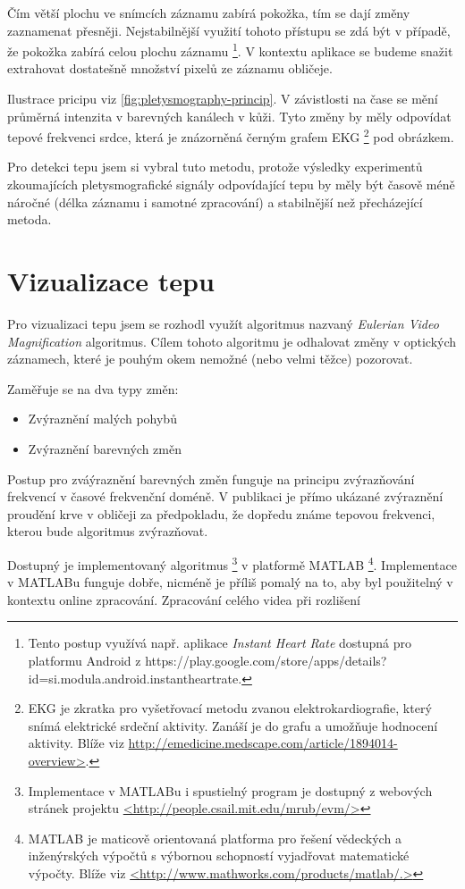 \documentclass[
  digital, %
  table,   %
%
  lof,     %
  lot,     %
]{fithesis3}
\begin{document}
Čím větší plochu ve snímcích záznamu zabírá pokožka, tím se dají změny zaznamenat přesněji. Nejstabilnější využití tohoto přístupu se zdá být v případě, že pokožka zabírá celou plochu záznamu
\footnote{Tento postup využívá např. aplikace \emph{Instant Heart Rate} dostupná pro platformu Android z https://play.google.com/store/apps/details?id=si.modula.android.instantheartrate.}. V kontextu aplikace se budeme snažit extrahovat dostatešně množství pixelů ze záznamu obličeje.

Ilustrace pricipu viz \ref{fig:pletysmography-princip}. V závistlosti na čase se mění průměrná intenzita v barevných kanálech v kůži. Tyto změny by měly odpovídat tepové frekvenci srdce, která je znázorněná černým grafem EKG
\footnote{EKG je zkratka pro vyšetřovací metodu zvanou elektrokardiografie, který snímá elektrické srdeční aktivity. Zanáší je do grafu a umožňuje hodnocení aktivity. Blíže viz \url{http://emedicine.medscape.com/article/1894014-overview>}.} pod obrázkem.

Pro detekci tepu jsem si vybral tuto metodu, protože výsledky experimentů\cite{remote-plethysmographic} zkoumajících pletysmografické signály odpovídající tepu by měly být časově méně náročné (délka záznamu i samotné zpracování) a stabilnější než přecházející metoda.

\section {Vizualizace tepu}
Pro vizualizaci tepu jsem se rozhodl využít algoritmus nazvaný \emph{Eulerian Video Magnification}\cite{eulerian-magnification} algoritmus. Cílem tohoto algoritmu je odhalovat změny v optických záznamech, které je pouhým okem nemožné (nebo velmi těžce) pozorovat.

Zaměřuje se na dva typy změn:
\begin{itemize}
	\item Zvýraznění malých pohybů
    \item Zvýraznění barevných změn
\end{itemize}

Postup pro zváýraznění barevných změn funguje na principu zvýrazňování frekvencí v časové frekvenční doméně.
V publikaci je přímo ukázané zvýraznění proudění krve v obličeji za předpokladu, že dopředu známe tepovou frekvenci, kterou bude algoritmus zvýrazňovat.

Dostupný je implementovaný algoritmus
\footnote{Implementace v MATLABu i spustielný program je dostupný z webových stránek projektu \url{<http://people.csail.mit.edu/mrub/evm/>}}
v platformě MATLAB
\footnote{MATLAB je maticově orientovaná platforma pro řešení vědeckých a inženýrských výpočtů s výbornou schopností vyjadřovat matematické výpočty. Blíže viz \url{<http://www.mathworks.com/products/matlab/.>}}.
Implementace v MATLABu funguje dobře, nicméně je příliš pomalý na to, aby byl použitelný v kontextu online zpracování. Zpracování celého videa při rozlišení
\end{document}
